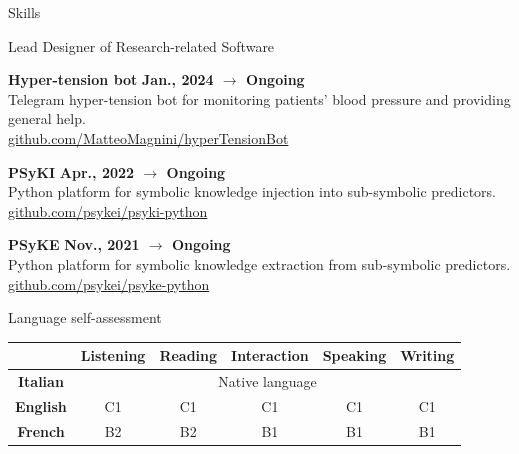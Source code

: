 \documentclass{resume} %
\begin{document}

    \begin{rSection}{Skills}


        \begin{rSubsection2}{Lead Designer of Research-related Software}
            \item\textbf{ Hyper-tension bot }\hfill \textbf{Jan., 2024 $\rightarrow$ Ongoing}
            \\Telegram hyper-tension bot for monitoring patients' blood pressure and providing general help.
            \\\url{github.com/MatteoMagnini/hyperTensionBot}
            \item\textbf{ PSyKI }\hfill \textbf{Apr., 2022 $\rightarrow$ Ongoing}
            \\Python platform for symbolic knowledge injection into sub-symbolic predictors.
            \\\url{github.com/psykei/psyki-python}
            \item\textbf{ PSyKE }\hfill \textbf{Nov., 2021 $\rightarrow$ Ongoing}
            \\Python platform for symbolic knowledge extraction from sub-symbolic predictors.
            \\\url{github.com/psykei/psyke-python}
        \end{rSubsection2}


        \begin{rNoListSubsection}{Language self-assessment}{}{}{}
            \begin{center}
                \begin{tabular}{|c|c|c|c|c|c|}
                    \hline
                    &\textbf{Listening}&\textbf{Reading}&\textbf{Interaction}&\textbf{Speaking}&\textbf{Writing}\\\hline
                    \textbf{Italian}&\multicolumn{5}{c}{Native language}\vline\\\hline
                    \textbf{English}&C1&C1&C1&C1&C1\\\hline
                    \textbf{French}&B2&B2&B1&B1&B1\\\hline
                \end{tabular}
            \end{center}
        \end{rNoListSubsection}


\end{rSection}
\end{document}
